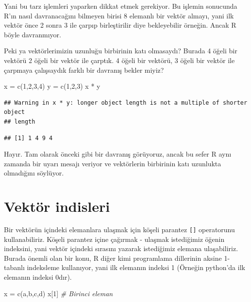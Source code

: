 \documentclass[
]{book}
\newenvironment{Shaded}{\begin{snugshade}}{\end{snugshade}}
\newcommand{\CommentTok}[1]{\textcolor[rgb]{0.56,0.35,0.01}{\textit{#1}}}
\newcommand{\DecValTok}[1]{\textcolor[rgb]{0.00,0.00,0.81}{#1}}
\newcommand{\FunctionTok}[1]{\textcolor[rgb]{0.00,0.00,0.00}{#1}}
\newcommand{\NormalTok}[1]{#1}
\newcommand{\OtherTok}[1]{\textcolor[rgb]{0.56,0.35,0.01}{#1}}
\newcommand{\SpecialCharTok}[1]{\textcolor[rgb]{0.00,0.00,0.00}{#1}}
\newcommand{\StringTok}[1]{\textcolor[rgb]{0.31,0.60,0.02}{#1}}
\begin{document}
Yani bu tarz işlemleri yaparken dikkat etmek gerekiyor. Bu işlemin sonucunda R'ın nasıl davranacağını bilmeyen birisi 8 elemanlı bir vektör almayı, yani ilk vektör önce 2 sonra 3 ile çarpıp birleştirilir diye bekleyebilir örneğin. Ancak R böyle davranmıyor.

Peki ya vektörlerimizin uzunluğu birbirinin katı olmasaydı? Burada 4 öğeli bir vektörü 2 öğeli bir vektör ile çarptık. 4 öğeli bir vektörü, 3 öğeli bir vektör ile çarpmaya çalışsaydık farklı bir davranış bekler miyiz?

\begin{Shaded}
\begin{Highlighting}[]
\NormalTok{x }\OtherTok{=} \FunctionTok{c}\NormalTok{(}\DecValTok{1}\NormalTok{,}\DecValTok{2}\NormalTok{,}\DecValTok{3}\NormalTok{,}\DecValTok{4}\NormalTok{)}
\NormalTok{y }\OtherTok{=} \FunctionTok{c}\NormalTok{(}\DecValTok{1}\NormalTok{,}\DecValTok{2}\NormalTok{,}\DecValTok{3}\NormalTok{)}
\NormalTok{x }\SpecialCharTok{*}\NormalTok{ y}
\end{Highlighting}
\end{Shaded}

\begin{verbatim}
## Warning in x * y: longer object length is not a multiple of shorter object
## length
\end{verbatim}

\begin{verbatim}
## [1] 1 4 9 4
\end{verbatim}

Hayır. Tam olarak önceki gibi bir davranış görüyoruz, ancak bu sefer R aynı zamanda bir uyarı mesajı veriyor ve vektörlerin birbirinin katı uzunlukta olmadığını söylüyor.

\hypertarget{vektuxf6r-indisleri}{%
\section{Vektör indisleri}\label{vektuxf6r-indisleri}}

Bir vektörün içindeki elemanlara ulaşmak için köşeli parantez \texttt{{[}{]}} operatorunu kullanabiliriz. Köşeli parantez içine çağırmak - ulaşmak istediğimiz öğenin indeksini, yani vektör içindeki sırasını yazarak istediğimiz elemana ulaşabiliriz. Burada önemli olan bir konu, R diğer kimi programlama dillerinin aksine 1-tabanlı indeksleme kullanıyor, yani ilk elemanın indeksi 1 (Örneğin python'da ilk elemanın indeksi 0dır).

\begin{Shaded}
\begin{Highlighting}[]
\NormalTok{x }\OtherTok{=} \FunctionTok{c}\NormalTok{(}\StringTok{\textquotesingle{}a\textquotesingle{}}\NormalTok{,}\StringTok{\textquotesingle{}b\textquotesingle{}}\NormalTok{,}\StringTok{\textquotesingle{}c\textquotesingle{}}\NormalTok{,}\StringTok{\textquotesingle{}d\textquotesingle{}}\NormalTok{)}
\NormalTok{x[}\DecValTok{1}\NormalTok{] }\CommentTok{\# Birinci eleman}
\end{Highlighting}
\end{Shaded}
\end{document}
